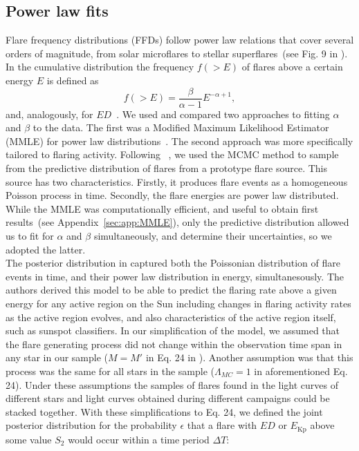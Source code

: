 \documentclass{aa}
\begin{document}
\subsection{Power law fits}
\label{powerlawfits}
Flare frequency distributions (FFDs) follow power law relations that cover several orders of magnitude, from solar microflares to stellar superflares~(see Fig. 9 in \citealt{shibayama2013}). In the cumulative distribution the frequency $f(>E)$ of flares above a certain energy $E$ is defined as
\begin{equation}
f(>E) = \dfrac{\beta}{\alpha - 1}E^{-\alpha + 1},
\label{eqn:cumdist}
\end{equation}
and, analogously, for $ED$~\citep{gershberg1972}. We used and compared two approaches to fitting $\alpha$ and $\beta$ to the data. The first was a Modified Maximum Likelihood Estimator (MMLE) for power law distributions~\citep{maschberger2009}. The second approach was more specifically tailored to flaring activity. Following ~\citet{wheatland_flaresbayes_2004}, we used the MCMC method to sample from the predictive distribution of flares from a prototype flare source. This source has two characteristics. Firstly, it produces flare events as a homogeneous Poisson process in time. Secondly, the flare energies are power law distributed. While the MMLE was computationally efficient, and useful to obtain first results~(see Appendix~\ref{sec:app:MMLE}), only the predictive distribution allowed us to fit for $\alpha$ and $\beta$ simultaneously, and determine their uncertainties, so we adopted the latter.
\\
The posterior distribution in \citet{wheatland_flaresbayes_2004} captured both the Poissonian distribution of flare events in time, and their power law distribution in energy, simultanesously. The authors derived this model to be able to predict the flaring rate above a given energy for any active region on the Sun including changes in flaring activity rates as the active region evolves, and also characteristics of the active region itself, such as sunspot classifiers. In our simplification of the model, we assumed that the flare generating process did not change within the observation time span in any star in our sample ($M=M'$ in Eq. 24 in \citealt{wheatland_flaresbayes_2004}). Another assumption was that this process was the same for all stars in the sample ($\Lambda_{MC}=1$ in aforementioned Eq. 24). Under these assumptions the samples of flares found in the light curves of different stars and light curves obtained during different campaigns could be stacked together. With these simplifications to Eq. 24, we defined the joint posterior distribution for the probability $\epsilon$ that a flare with $ED$ or $E_\mathrm{Kp}$ above some value $S_2$ would occur within a time period $\Delta T$:
\end{document}
